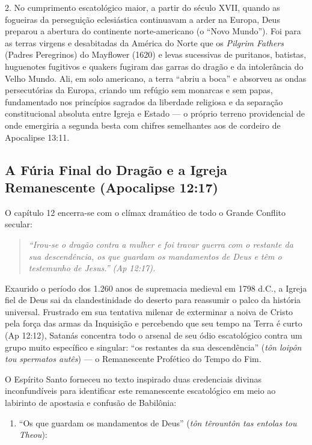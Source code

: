 \documentclass[11pt,a4paper,openany]{book}
\begin{document}
2. No cumprimento escatológico maior, a partir do século XVII, quando as fogueiras da perseguição eclesiástica continuavam a arder na Europa, Deus preparou a abertura do continente norte-americano (o ``Novo Mundo''). Foi para as terras virgens e desabitadas da América do Norte que os \textit{Pilgrim Fathers} (Padres Peregrinos) do Mayflower (1620) e levas sucessivas de puritanos, batistas, huguenotes fugitivos e quakers fugiram das garras do dragão e da intolerância do Velho Mundo. Ali, em solo americano, a terra ``abriu a boca'' e absorveu as ondas persecutórias da Europa, criando um refúgio sem monarcas e sem papas, fundamentado nos princípios sagrados da liberdade religiosa e da separação constitucional absoluta entre Igreja e Estado — o próprio terreno providencial de onde emergiria a segunda besta com chifres semelhantes aos de cordeiro de Apocalipse 13:11.



\subsection{A Fúria Final do Dragão e a Igreja Remanescente (Apocalipse 12:17)}


O capítulo 12 encerra-se com o clímax dramático de todo o Grande Conflito secular:

\begin{quote}
\itshape ``Irou-se o dragão contra a mulher e foi travar guerra com o restante da sua descendência, os que guardam os mandamentos de Deus e têm o testemunho de Jesus.'' (Ap 12:17).
\end{quote}


Exaurido o período dos 1.260 anos de supremacia medieval em 1798 d.C., a Igreja fiel de Deus sai da clandestinidade do deserto para reassumir o palco da história universal. Frustrado em sua tentativa milenar de exterminar a noiva de Cristo pela força das armas da Inquisição e percebendo que seu tempo na Terra é curto (Ap 12:12), Satanás concentra todo o arsenal de seu ódio escatológico contra um grupo muito específico e singular: ``os restantes da sua descendência'' (\textit{tôn loipôn tou spermatos autês}) — o Remanescente Profético do Tempo do Fim.

O Espírito Santo forneceu no texto inspirado duas credenciais divinas inconfundíveis para identificar este remanescente escatológico em meio ao labirinto de apostasia e confusão de Babilônia:

\begin{enumerate}
  \item ``Os que guardam os mandamentos de Deus'' (\textit{tôn têrountôn tas entolas tou Theou}):
\end{enumerate}
\end{document}
